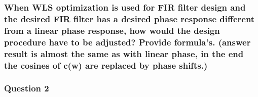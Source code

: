 \documentclass[
  a4paper,
  ,captions=tableheading
]{scrartcl}
\begin{document}
\begin{enumerate}
  \subsubsection{When WLS optimization is used for FIR filter design and
  the desired FIR filter has a desired phase response different from a
  linear phase response, how would the design procedure have to be
  adjusted? Provide formula's. (answer result is almost the same as with
  linear phase, in the end the cosines of c(w) are replaced by phase
  shifts.)}\label{when-wls-optimization-is-used-for-fir-filter-design-and-the-desired-fir-filter-has-a-desired-phase-response-different-from-a-linear-phase-response-how-would-the-design-procedure-have-to-be-adjusted-provide-formulas.-answer-result-is-almost-the-same-as-with-linear-phase-in-the-end-the-cosines-of-cw-are-replaced-by-phase-shifts.}
\end{enumerate}

\subsubsection{Question 2}\label{question-2-1}
\end{document}
